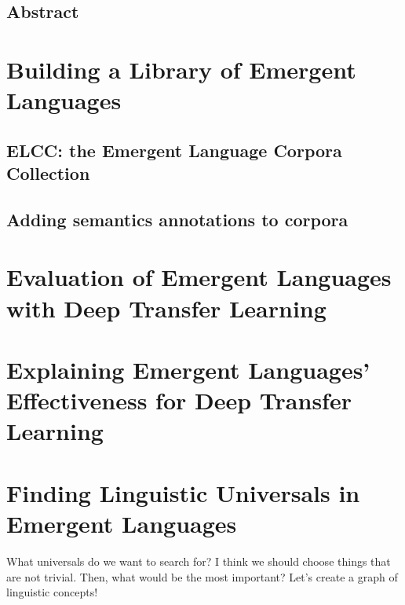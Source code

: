 






\newpage
\thispagestyle{plain}
\section*{Abstract}

\newpage
\tableofcontents*



\chapter{Building a Library of Emergent Languages}

\section{ELCC: the Emergent Language Corpora Collection }


\section{Adding semantics annotations to corpora }
\unskip\label{sec:rich-corpora}

\chapter{Evaluation of Emergent Languages with Deep Transfer Learning}



\chapter{Explaining Emergent Languages' Effectiveness for Deep Transfer Learning }
\unskip\label{ch:xferbench-analysis}



\chapter{Finding Linguistic Universals in Emergent Languages }
\unskip\label{ch:universals}

What universals do we want to search for?
I think we should choose things that are not trivial.
Then, what would be the most important?
Let's create a graph of linguistic concepts!

